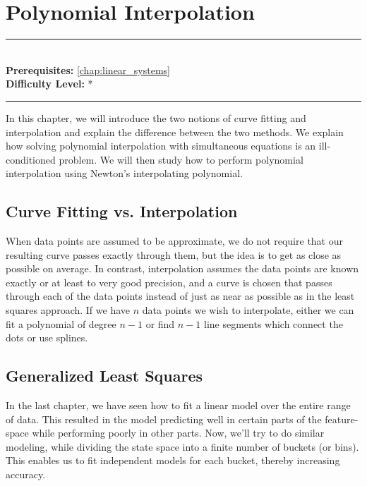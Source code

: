 \documentclass[book.tex]{subfiles}
\begin{document}
\chapter{Polynomial Interpolation}
\label{chap:polynomial}
\noindent\rule{11cm}{0.4pt} \\
\textbf{Prerequisites:} \autoref{chap:linear_systems} \\
\textbf{Difficulty Level:} * \\
\noindent\rule{11cm}{0.4pt}
\vspace{5mm}

In this chapter, we will introduce the two notions of curve fitting and interpolation and explain the difference between the two methods. We explain how solving polynomial interpolation with simultaneous equations is an ill-conditioned problem. We will then study how to perform polynomial interpolation using Newton's interpolating polynomial.

\section{Curve Fitting vs. Interpolation}

When data points are assumed to be approximate, we do not require that our resulting curve passes exactly through them, but the idea is to get as close as possible on average. In contrast, interpolation assumes the data points are known exactly or at least to very good precision, and a curve is chosen that passes through each of the data points instead of just as near as possible as in the least squares approach. If we have $n$ data points we wish to interpolate, either we can fit a polynomial of degree $n - 1$ or find $n - 1$ line segments which connect the dots or use splines.

\section{Generalized Least Squares}

In the last chapter, we have seen how to fit a linear model over the entire range of data. This resulted in the model predicting well in certain parts of the feature-space while performing poorly in other parts. Now, we'll try to do similar modeling, while dividing the state space into a finite number of buckets (or bins). This enables us to fit independent models for each bucket, thereby increasing accuracy.
\end{document}
